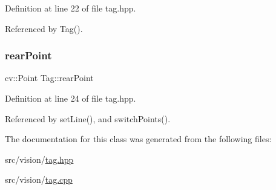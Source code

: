 Definition at line 22 of file tag.\+hpp.



Referenced by Tag().

\mbox{\label{class_tag_adfb71b0abef8e25842afa292397b8140}} 
\subsubsection{\texorpdfstring{rear\+Point}{rearPoint}}
{\footnotesize\ttfamily cv\+::\+Point Tag\+::rear\+Point}



Definition at line 24 of file tag.\+hpp.



Referenced by set\+Line(), and switch\+Points().



The documentation for this class was generated from the following files\+:\begin{DoxyCompactItemize}
\item 
src/vision/\hyperlink{tag_8hpp}{tag.\+hpp}\item 
src/vision/\hyperlink{tag_8cpp}{tag.\+cpp}\end{DoxyCompactItemize}
